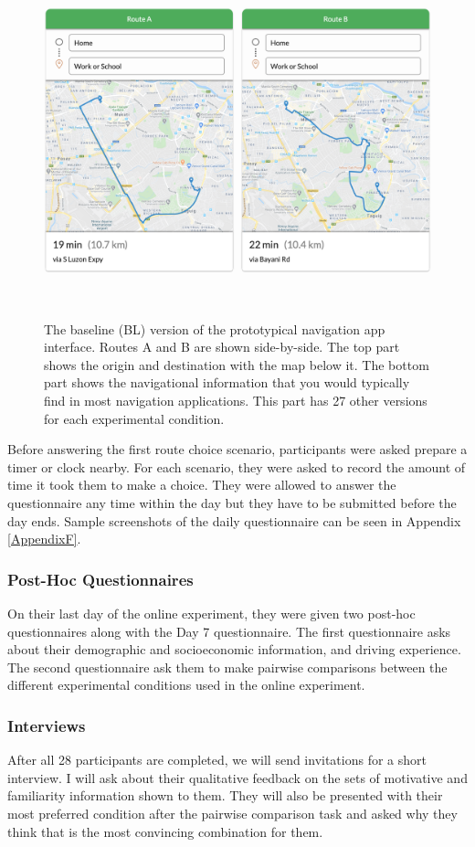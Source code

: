 \begin{figure}[h]
\centering
  \includegraphics[scale=0.4]{figures/s3-daily-proto.png}
  \caption{The baseline (BL) version of the prototypical navigation app interface. Routes A and B are shown side-by-side. The top part shows the origin and destination with the map below it. The bottom part shows the navigational information that you would typically find in most navigation applications. This part has 27 other versions for each experimental condition.}~\label{fig:s3-daily-proto}
\end{figure}

Before answering the first route choice scenario, participants were asked prepare a timer or clock nearby. For each scenario, they were asked to record the amount of time it took them to make a choice. They were allowed to answer the questionnaire any time within the day but they have to be submitted before the day ends. Sample screenshots of the daily questionnaire can be seen in Appendix \ref{AppendixF}.

\subsubsection{Post-Hoc Questionnaires}
On their last day of the online experiment, they were given two post-hoc questionnaires along with the Day 7 questionnaire. The first questionnaire asks about their demographic and socioeconomic information, and driving experience. The second questionnaire ask them to make pairwise comparisons between the different experimental conditions used in the online experiment.  

\subsubsection{Interviews}
After all 28 participants are completed, we will send invitations for a short interview. I will ask about their qualitative feedback on the sets of motivative and familiarity information shown to them. They will also be presented with their most preferred condition after the pairwise comparison task and asked why they think that is the most convincing combination for them.


